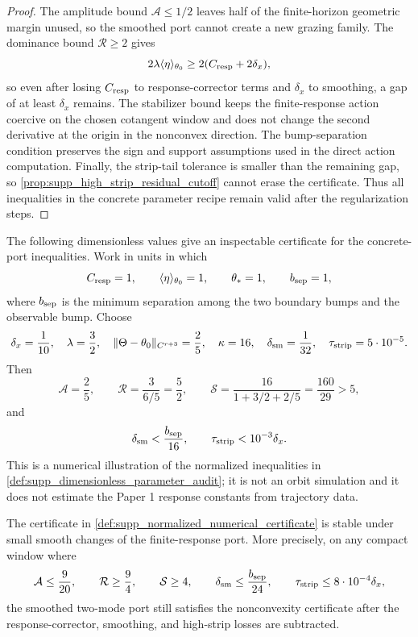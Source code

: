 \begin{proof}
The amplitude bound \(\mathcal A\le1/2\) leaves half of the finite-horizon
geometric margin unused, so the smoothed port cannot create a new grazing
family.  The dominance bound \(\mathcal R\ge2\) gives
\[
  2\lambda\langle\eta\rangle_{\theta_0}
  \ge 2(C_{\rm resp}+2\delta_x),
\]
so even after losing \(C_{\rm resp}\) to response-corrector terms and
\(\delta_x\) to smoothing, a gap of at least \(\delta_x\) remains.  The
stabilizer bound keeps the finite-response action coercive on the chosen
cotangent window and does not change the second derivative at the origin in
the nonconvex direction.  The bump-separation condition preserves the sign and
support assumptions used in the direct action computation.  Finally, the
strip-tail tolerance is smaller than the remaining gap, so
\cref{prop:supp_high_strip_residual_cutoff} cannot erase the certificate.
Thus all inequalities in the concrete parameter recipe remain valid after the
regularization steps.
\end{proof}

\begin{definition}
\label{def:supp_normalized_numerical_certificate}
The following dimensionless values give an inspectable certificate for the
concrete-port inequalities.  Work in units in which
\[
  C_{\rm resp}=1,\qquad
  \langle\eta\rangle_{\theta_0}=1,\qquad
  \theta_*=1,
  \qquad
  b_{\rm sep}=1,
\]
where \(b_{\rm sep}\) is the minimum separation among the two boundary bumps
and the observable bump.  Choose
\[
  \delta_x=\frac1{10},\quad
  \lambda=\frac32,\quad
  \|\Theta-\theta_0\|_{C^{r+3}}=\frac25,\quad
  \kappa=16,\quad
  \delta_{\rm sm}=\frac1{32},\quad
  \tau_{\rm strip}=5\cdot 10^{-5}.
\]
Then
\[
  \mathcal A=\frac25,\qquad
  \mathcal R=\frac{3}{6/5}=\frac52,\qquad
  \mathcal S=\frac{16}{1+3/2+2/5}=\frac{160}{29}>5,
\]
and
\[
  \delta_{\rm sm}<\frac{b_{\rm sep}}{16},
  \qquad
  \tau_{\rm strip}<10^{-3}\delta_x .
\]
This is a numerical illustration of the normalized inequalities in
\cref{def:supp_dimensionless_parameter_audit}; it is not an orbit simulation
and it does not estimate the Paper 1 response constants from trajectory data.
\end{definition}

\begin{proposition}
\label{prop:supp_numerical_certificate_margin}
The certificate in \cref{def:supp_normalized_numerical_certificate} is stable
under small smooth changes of the finite-response port.  More precisely, on
any compact window where
\[
  \mathcal A\le \frac9{20},\qquad
  \mathcal R\ge \frac94,\qquad
  \mathcal S\ge 4,\qquad
  \delta_{\rm sm}\le\frac{b_{\rm sep}}{24},\qquad
  \tau_{\rm strip}\le 8\cdot10^{-4}\delta_x,
\]
the smoothed two-mode port still satisfies the nonconvexity certificate after
the response-corrector, smoothing, and high-strip losses are subtracted.
\end{proposition}

